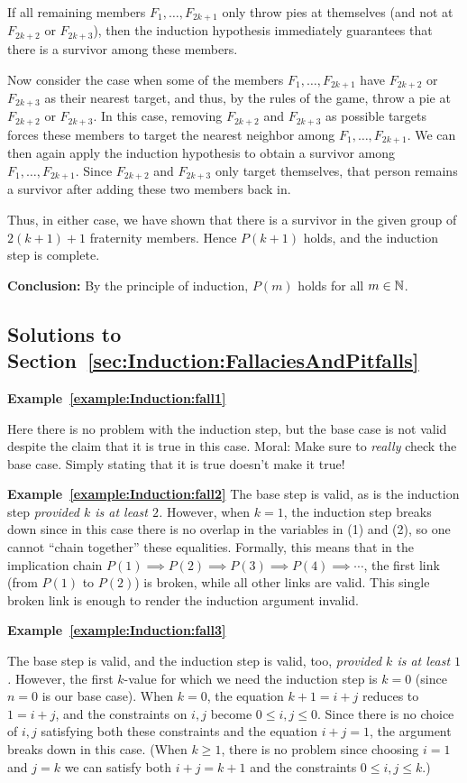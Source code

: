 If all remaining members $F_1,\dots, F_{2k+1}$ only throw  pies at themselves
(and  not at $F_{2k+2}$ or $F_{2k+3}$), then the induction hypothesis
immediately guarantees that there is a survivor among these members. 

Now consider the case when some of the members
$F_1,\dots,F_{2k+1}$
have  $F_{2k+2}$ or
$F_{2k+3}$ as their nearest target, and thus, by the rules of the game, throw a
pie at $F_{2k+2}$ or $F_{2k+3}$.  In this case, removing   $F_{2k+2}$ and
$F_{2k+3}$ as possible targets forces these members to target the nearest
neighbor among 
$F_1,\dots,F_{2k+1}$.
We can then again apply   the
induction hypothesis to obtain a survivor among $F_1,\dots,F_{2k+1}$.
Since $F_{2k+2}$ and $F_{2k+3}$ only target themselves, that person remains a
survivor after adding these two members back in. 

Thus, in either case, we have shown that there is a survivor in the given group of 
$2(k+1)+1$ fraternity members. Hence $P(k+1)$ holds, and the induction step is
complete.   

\textbf{Conclusion:} By the principle of induction, $P(m)$ holds for all
$m\in\mathbb{N}$.

\subsection{Solutions to Section~\ref{sec:Induction:FallaciesAndPitfalls} } 

\textbf{Example~\ref{example:Induction:fall1}}

Here there is no problem with the induction step, but the base case
is not valid despite the claim that it is true in this case.
Moral: Make sure to \emph{really} check the base case. Simply 
stating that it is true doesn't make it true!

\textbf{Example~\ref{example:Induction:fall2}}
The base step is valid, as is the induction step \emph{provided $k$
is at least $2$.} However, when $k=1$, the induction step breaks down since in
this case there is no overlap in the variables in (1) and (2), so one cannot
``chain together'' these equalities. Formally, this means that in the
implication chain $P(1)\implies P(2)\implies P(3)\implies P(4)\implies\cdots$, the
first link (from $P(1)$ to $P(2)$) is broken, while all other links are valid.
This single broken link is enough to render the induction argument invalid.


\textbf{Example~\ref{example:Induction:fall3}}

The base step is valid, and the induction step is valid, too,
\emph{provided $k$ is at least $1$.} However, the first $k$-value for which
we need the induction step is $k=0$ (since $n=0$ is our base case). When
$k=0$, the equation $k+1=i+j$ reduces to $1=i+j$, 
and the constraints on $i,j$ become $0\le i,j\le 0$. Since there is no  
choice of $i,j$ satisfying both these constraints  and the equation $i+j=1$,
the argument breaks down in this case. (When $k\ge1$, there is no problem
since choosing $i=1$ and $j=k$ we can satisfy both $i+j=k+1$ and 
the constraints $0\le i,j\le k$.)

